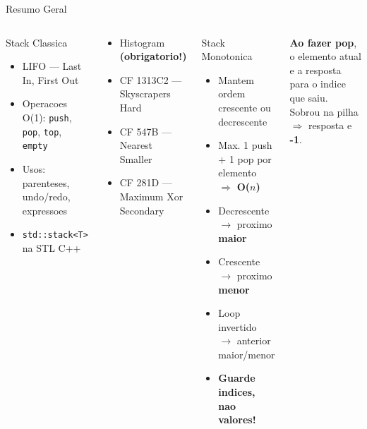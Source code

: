 \documentclass[aspectratio=169,11pt]{beamer}
\begin{document}
\begin{frame}[shrink=6]{Resumo Geral}
  \begin{columns}[t]
      \begin{block}{Stack Classica}
        \begin{itemize}\small
          \item LIFO --- Last In, First Out
          \item Operacoes O(1): \texttt{push}, \texttt{pop}, \texttt{top}, \texttt{empty}
          \item Usos: parenteses, undo/redo, expressoes
          \item \texttt{std::stack<T>} na STL C++
        \end{itemize}
      \end{block}
      \vspace{0.12cm}
      \begin{tcolorbox}[caixaVerde,title={Problemas para Praticar}]
        \footnotesize
        \begin{itemize}
          \item Histogram \textbf{(obrigatorio!)}
          \item CF 1313C2 --- Skyscrapers Hard
          \item CF 547B --- Nearest Smaller
          \item CF 281D --- Maximum Xor Secondary
        \end{itemize}
      \end{tcolorbox}
      \begin{block}{Stack Monotonica}
        \begin{itemize}\small
          \item Mantem ordem crescente ou decrescente
          \item Max. 1 push + 1 pop por elemento $\Rightarrow$ \textbf{O($n$)}
          \item Decrescente $\to$ proximo \textbf{maior}
          \item Crescente $\to$ proximo \textbf{menor}
          \item Loop invertido $\to$ anterior maior/menor
          \item \textbf{Guarde indices, nao valores!}
        \end{itemize}
      \end{block}
      \vspace{0.12cm}
      \begin{tcolorbox}[caixaVermelho,title={Regra de Ouro}]
        \footnotesize
        \textbf{Ao fazer pop}, o elemento atual e a resposta para o indice que saiu.\\[3pt]
        Sobrou na pilha $\Rightarrow$ resposta e \textbf{-1}.
      \end{tcolorbox}
  \end{columns}
\end{frame}
\end{document}
